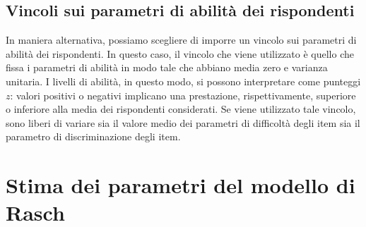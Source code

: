 \subsection{Vincoli sui parametri di abilità dei rispondenti}

In maniera alternativa, possiamo scegliere di imporre un vincolo sui
parametri di abilità dei rispondenti. In questo caso, il vincolo
che viene utilizzato è quello che fissa  i parametri di abilità in modo tale che abbiano media zero e varianza unitaria. I livelli di abilità, in questo modo, si possono
interpretare come punteggi $z$: valori positivi o negativi implicano
una prestazione, rispettivamente, superiore o inferiore alla media dei rispondenti considerati. Se viene utilizzato tale vincolo, sono liberi di variare sia il valore medio dei parametri di difficoltà  degli item sia il
parametro di discriminazione degli item.

\section{Stima dei parametri del modello di Rasch}





